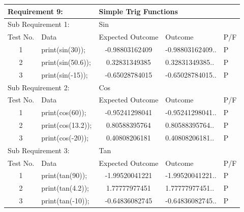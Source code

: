\documentclass[a4paper, oneside, 11pt]{report}
\begin{document}
\begin{table}
\label{tab:req9}
\begin{tabular}{cllll}
\hline
\multicolumn{2}{l}{Requirement 9:}                 & \multicolumn{3}{l}{Simple Trig Functions}          \\ \hline
\multicolumn{2}{l}{Sub Requirement 1:}             & \multicolumn{3}{l}{Sin}                            \\
\multicolumn{1}{l}{Test No.} & Data                & Expected Outcome                   & Outcome & P/F \\
1                            & print(sin(30));     & \multicolumn{1}{c}{-0.98803162409} & -0.98803162409..        &  P   \\
2                            & print(sin(50.6));   & \multicolumn{1}{c}{0.32831349385}  &  0.32831349385..        &  P   \\
3                            & print(sin(-15));    & \multicolumn{1}{c}{-0.65028784015} & -0.65028784015..        &   P  \\
\multicolumn{2}{l}{Sub Requirement 2:}             & \multicolumn{3}{l}{Cos}                            \\
\multicolumn{1}{l}{Test No.} & Data                & Expected Outcome                   & Outcome & P/F \\
1                            & print(cos(60));     & \multicolumn{1}{c}{-0.95241298041} & -0.95241298041..        &  P   \\
2                            & print(cos(13.2));   & \multicolumn{1}{c}{0.80588395764}  &  0.80588395764..        &  P   \\
3                            & print(cos(-20));    & \multicolumn{1}{c}{0.40808206181}  &  0.40808206181..       &  P   \\
\multicolumn{2}{l}{Sub Requirement 3:}             & \multicolumn{3}{l}{Tan}                            \\
\multicolumn{1}{l}{Test No.} & Data                & Expected Outcome                   & Outcome & P/F \\
1                            & print(tan(90));     & \multicolumn{1}{c}{-1.99520041221} & -1.99520041221..        &  P   \\
2                            & print(tan(4.2));    & \multicolumn{1}{c}{1.77777977451}  &  1.77777977451..       &   P  \\
3                            & print(tan(-10));    & \multicolumn{1}{c}{-0.64836082745} & -0.64836082745..        &   P  \\

\end{tabular}
\end{table}
\end{document}
